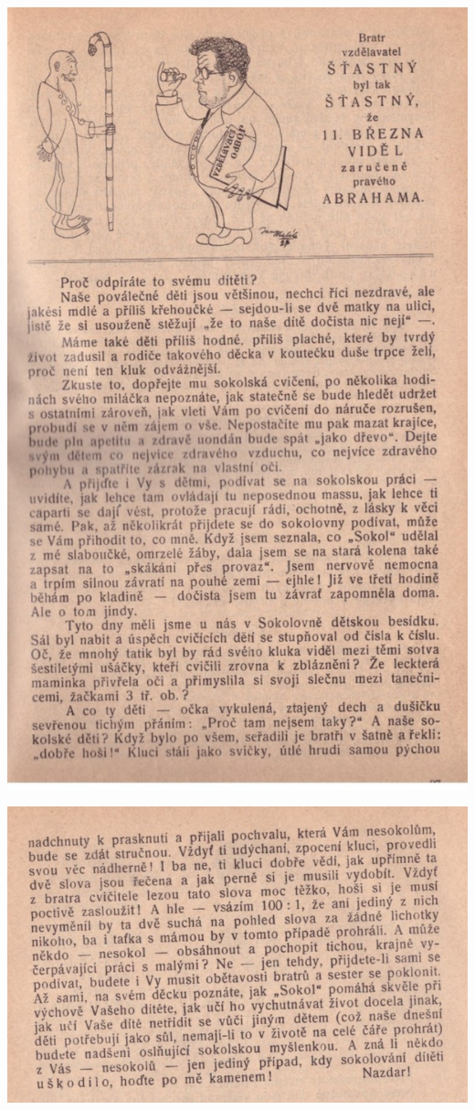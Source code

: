 \documentclass[11pt]{article}
\begin{document}
\includegraphics[width=\imagewidth]{original/1927/Skener_20250316 (4).jpg}

\includegraphics[width=\imagewidth]{original/1927/Skener_20250316 (5).jpg}
\end{document}
